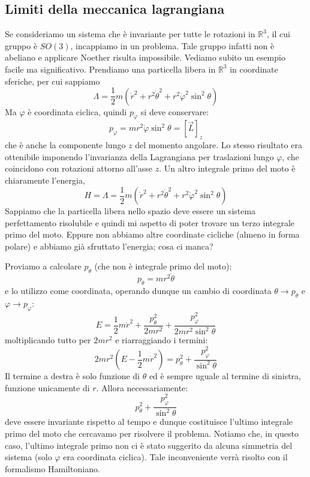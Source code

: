 \documentclass[a4paper,openany]{article}
\begin{document}
	\subsection{Limiti della meccanica lagrangiana}
	Se consideriamo un sistema che è invariante per tutte le rotazioni in $\mathbb{R}^{3}$, il cui gruppo è $SO(3)$, incappiamo in un problema. Tale gruppo infatti non è abeliano e applicare Noether risulta impossibile. Vediamo subito un esempio facile ma significativo. Prendiamo una particella libera in $\mathbb{R}^{3}$ in coordinate sferiche, per cui sappiamo
	\begin{equation}\label{key}
		\Lambda = \dfrac{1}{2}m(\dot{r}^2+r^2\dot{\theta}^2+r^2\dot{\varphi}^2\sin^2\theta)
	\end{equation}
	Ma $\varphi$ è coordinata ciclica, quindi $p_\varphi$ si deve conservare:
	\begin{equation}\label{key}
		p_\varphi = mr^2\dot{\varphi}\sin^2\theta = [ \vec{L}]_z
	\end{equation}
	che è anche la componente lungo $z$ del momento angolare. Lo stesso risultato era ottenibile imponendo l'invarianza della Lagrangiana per traslazioni lungo $\varphi$, che coincidono con rotazioni attorno all'asse $z$. Un altro integrale primo del moto è chiaramente l'energia,
	\begin{equation}\label{key}
		H = \Lambda = \dfrac{1}{2}m(\dot{r}^2+r^2\dot{\theta}^2+r^2\dot{\varphi}^2\sin^2\theta)
	\end{equation}
	Sappiamo che la particella libera nello spazio deve essere un sistema perfettamento risolubile e quindi mi aspetto di poter trovare un terzo integrale primo del moto. Eppure non abbiamo altre coordinate cicliche (almeno in forma polare) e abbiamo già sfruttato l'energia; cosa ci manca? 
	
	Proviamo a calcolare $p_\theta$ (che non è integrale primo del moto):
	\begin{equation}\label{key}
		p_{\theta} = mr^2\dot{\theta} 
	\end{equation}
	e lo utilizzo come coordinata, operando dunque un cambio di coordinata $\theta \rightarrow p_\theta$ e $\varphi \rightarrow p_\varphi$:
	\begin{equation}\label{key}
		E = \dfrac{1}{2}m\dot{r}^2 + \dfrac{p_{\theta}^{2}}{2mr^{2}} + \dfrac{p_{\varphi}^2}{2mr^2\sin^2\theta}
	\end{equation}
	moltiplicando tutto per $2mr^{2}$ e riarraggiando i termini:
	\begin{equation}\label{key}
		2mr^2 (E - \dfrac{1}{2}m\dot{r}^2)  =  p_{\theta}^{2} + \dfrac{p_{\varphi}^2}{\sin^2\theta}
	\end{equation}
	Il termine a destra è solo funzione di $\theta$ ed è sempre uguale al termine di sinistra, funzione unicamente di $r$. Allora necessariamente:
	$$
	p_{\theta}^{2} + \dfrac{p_{\varphi}^2}{\sin^2\theta}
	$$
	deve essere invariante rispetto al tempo e dunque costituisce l'ultimo integrale primo del moto che cercavamo per risolvere il problema. Notiamo che, in questo caso, l'ultimo integrale primo non ci è stato suggerito da alcuna simmetria del sistema (solo $\varphi$ era coordinata ciclica). Tale inconveniente verrà risolto con il formalismo Hamiltoniano.
	
\end{document}
